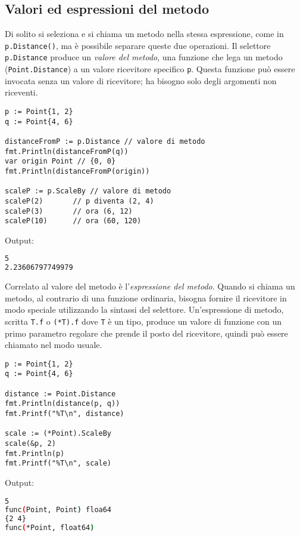 \documentclass[../../thesis.tex]{subfiles}
\begin{document}
    \subsection{Valori ed espressioni del metodo}\label{subsec:valori-ed-espressioni-del-metodo}
    Di solito si seleziona e si chiama un metodo nella stessa espressione, come in \verb"p.Distance()", ma è possibile separare queste due operazioni.
    Il selettore \verb"p.Distance" produce un \textit{valore del metodo}, una funzione che lega un metodo (\verb"Point.Distance") a un valore ricevitore specifico \verb"p".
    Questa funzione può essere invocata senza un valore di ricevitore;
    ha bisogno solo degli argomenti non riceventi.
    \begin{lstlisting}[frame = single,label={lst:lstlisting5-4.1}]
p := Point{1, 2}
q := Point{4, 6}

distanceFromP := p.Distance // valore di metodo
fmt.Println(distanceFromP(q))
var origin Point // {0, 0}
fmt.Println(distanceFromP(origin))

scaleP := p.ScaleBy // valore di metodo
scaleP(2)	    // p diventa (2, 4)
scaleP(3)	    // ora (6, 12)
scaleP(10)	    // ora (60, 120)
    \end{lstlisting}
    Output:
    \begin{lstlisting}[language = bash, frame = L,label={lst:lstlisting5-4.2}]
5
2.23606797749979
    \end{lstlisting}
    Correlato al valore del metodo è l'\textit{espressione del metodo}.
    Quando si chiama un metodo, al contrario di una funzione ordinaria, bisogna fornire il ricevitore in modo speciale utilizzando la sintassi del selettore.
    Un'espressione di metodo, scritta \verb"T.f" o \verb"(*T).f" dove \verb"T" è un tipo, produce un valore di funzione con un primo parametro regolare che prende il posto del ricevitore, quindi può essere chiamato nel modo usuale.
    \begin{lstlisting}[frame = single,label={lst:lstlisting5-4.3}]
p := Point{1, 2}
q := Point{4, 6}

distance := Point.Distance
fmt.Println(distance(p, q))
fmt.Printf("%T\n", distance)

scale := (*Point).ScaleBy
scale(&p, 2)
fmt.Println(p)
fmt.Printf("%T\n", scale)
    \end{lstlisting}
    \newpage\noindent Output:
    \begin{lstlisting}[language = bash, frame = L,label={lst:lstlisting5-4.4}]
5
func(Point, Point) floa64
{2 4}
func(*Point, float64)
    \end{lstlisting}
\end{document}
